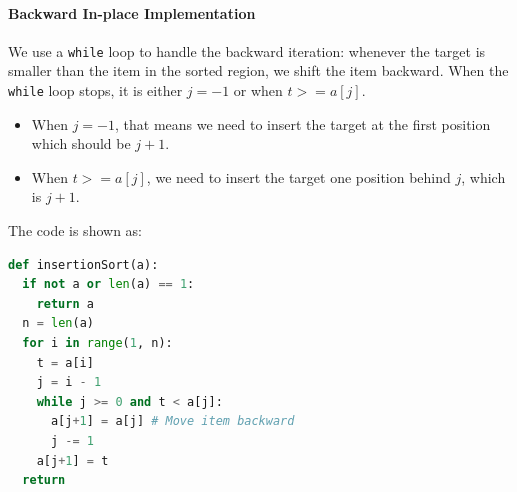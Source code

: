 \documentclass[../main.tex]{subfiles}
\begin{document}
\paragraph{Backward In-place Implementation}
We use a \texttt{while} loop to handle the backward iteration: whenever the target is smaller than the item in the sorted region, we shift the item backward. When the \texttt{while} loop stops, it is either $j = -1$ or when $t >= a[j]$. 
\begin{itemize}
    \item When $j=-1$, that means we need to insert the target at the first position which should be $j+1$. 
\item When $t >= a[j]$, we need to insert the target one position behind $j$, which is $j+1$. 
\end{itemize}
The code is shown as:
\begin{lstlisting}[language=Python]
def insertionSort(a):
  if not a or len(a) == 1:
    return a
  n = len(a)
  for i in range(1, n):
    t = a[i]
    j = i - 1
    while j >= 0 and t < a[j]: 
      a[j+1] = a[j] # Move item backward
      j -= 1
    a[j+1] = t      
  return
\end{lstlisting}



    
    
  


\end{document}
